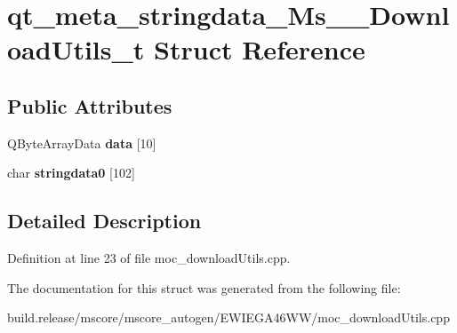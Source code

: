 \hypertarget{structqt__meta__stringdata___ms_____download_utils__t}{}\section{qt\+\_\+meta\+\_\+stringdata\+\_\+\+Ms\+\_\+\+\_\+\+Download\+Utils\+\_\+t Struct Reference}
\label{structqt__meta__stringdata___ms_____download_utils__t}
\subsection*{Public Attributes}
\begin{DoxyCompactItemize}
\item 
\mbox{\label{structqt__meta__stringdata___ms_____download_utils__t_a772fb9623210ccac1341e471e83bd839}} 
Q\+Byte\+Array\+Data {\bfseries data} \mbox{[}10\mbox{]}
\item 
\mbox{\label{structqt__meta__stringdata___ms_____download_utils__t_a46fbbb4951b12359f60c28220fe0e8b8}} 
char {\bfseries stringdata0} \mbox{[}102\mbox{]}
\end{DoxyCompactItemize}


\subsection{Detailed Description}


Definition at line 23 of file moc\+\_\+download\+Utils.\+cpp.



The documentation for this struct was generated from the following file\+:\begin{DoxyCompactItemize}
\item 
build.\+release/mscore/mscore\+\_\+autogen/\+E\+W\+I\+E\+G\+A46\+W\+W/moc\+\_\+download\+Utils.\+cpp\end{DoxyCompactItemize}
